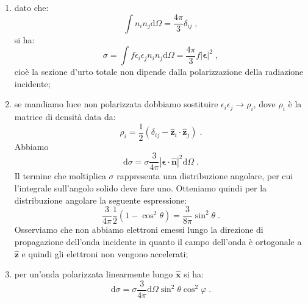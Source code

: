 \documentclass[10pt,a4paper]{report}
\theoremstyle{definition}
\numberwithin{equation}{section}
\newcommand{\diff}[1][]{\mathrm{d}#1}
\begin{document}
\begin{enumerate}
\item dato che:
\begin{equation}
\int n_in_j\diff{\Omega}=\frac{4\pi}{3}\delta_{ij}\;,
\end{equation}
si ha:
\begin{equation}
\sigma=\int f\epsilon_i\epsilon_jn_in_j\diff{\Omega}=\frac{4\pi}{3}f|\boldsymbol{\epsilon}|^2\;,
\end{equation}
cioè la sezione d'urto totale non dipende dalla polarizzazione della radiazione incidente;
\item se mandiamo luce non polarizzata dobbiamo sostituire $\epsilon_i\epsilon_j\rightarrow \rho_i$, dove $\rho_i$ è la matrice di densità data da:
\begin{equation}
\rho_i=\frac{1}{2}(\delta_{ij}-\hat{\mathbf{z}}_i\cdot\hat{\mathbf{z}}_j)\;.
\end{equation}
Abbiamo
\begin{equation}
\diff{\sigma}=\sigma \frac{3}{4\pi}|\boldsymbol{\epsilon}\cdot\hat{\mathbf{n}}|^2\diff{\Omega}\;.
\end{equation}
Il termine che moltiplica $\sigma$ rappresenta una distribuzione angolare, per cui l'integrale sull'angolo solido deve fare uno. Otteniamo quindi per la distribuzione angolare la seguente espressione:
\begin{equation}
\frac{3}{4\pi}\frac{1}{2}(1-\cos^2\theta)=\frac{3}{8\pi}\sin^2\theta\;.
\end{equation}
Osserviamo che non abbiamo elettroni emessi lungo la direzione di propagazione dell'onda incidente in quanto il campo dell'onda è ortogonale a $\hat{\mathbf{z}}$ e quindi gli elettroni non vengono accelerati;
\item per un'onda polarizzata linearmente lungo $\hat{\mathbf{x}}$ si ha:
\begin{equation}
\diff{\sigma}=\sigma \frac{3}{4\pi}\diff{\Omega}\sin^2\theta\cos^2\varphi\;.
\end{equation}
\end{enumerate}
\end{document}

